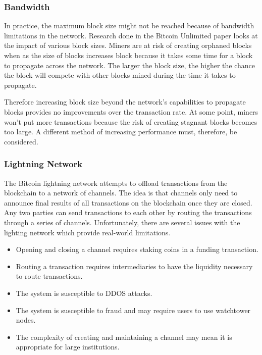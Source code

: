 \documentclass{article}
\begin{document}
\subsubsection{Bandwidth}

In practice, the maximum block size might not be reached because of bandwidth limitations
in the network. Research done in the Bitcoin Unlimited paper \cite{bitcoinunlimited} looks
at the impact of various block sizes. Miners are at risk of creating orphaned blocks 
when as the size of blocks increases block because it takes some time for a block to propagate
across the network. The larger the block size, the higher the chance the block will
compete with other blocks mined during the time it takes to propagate.

Therefore increasing block size beyond the network's capabilities to propagate blocks
provides no improvements over the transaction rate. At some point, miners won't put more
transactions because the risk of creating stagnant blocks becomes too large. A 
different method of increasing performance must, therefore, be considered.

\subsubsection{Lightning Network}

The Bitcoin lightning network attempts to offload transactions from the blockchain
to a network of channels. The idea is that channels only need to announce final
results of all transactions on the blockchain once they are closed. Any two parties
can send transactions to each other by routing the transactions through a series of
channels. Unfortunately, there are several issues with the lighting network which
provide real-world limitations.

\begin{itemize}
    \item Opening and closing a channel requires staking coins in a funding transaction.
    \item Routing a transaction requires intermediaries to have the liquidity necessary
        to route transactions.
    \item The system is susceptible to DDOS attacks.
    \item The system is susceptible to fraud and may require users to use watchtower 
        nodes.
    \item The complexity of creating and maintaining a channel may mean it is appropriate for large institutions.
\end{itemize}
\end{document}
